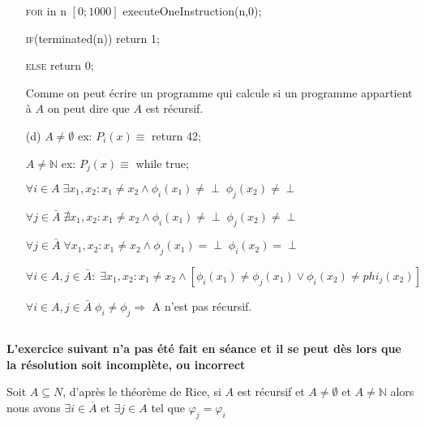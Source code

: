 \begin{itemize}
	\textsc{for} in n $[0;1000]$ executeOneInstruction(n,0);
	 
	\textsc{if}(terminated(n)) return 1;
	 
	\textsc{else} return 0;
	
	Comme on peut écrire un programme qui calcule si un programme appartient à $A$ on peut dire que $A$ est récursif.
	
	\item[(d)] $A \neq \emptyset$ ex: $P_i(x) \equiv$ return 42;
	
	$A \neq \mathbb{N}$ ex: $P_j(x) \equiv$ while true;
	
	$\forall i \in A \; \exists x_1, x_2 : x_1 \neq x_2 \land \phi_i(x_1) \neq \perp \; \phi_j(x_2) \neq \perp$
	
	$\forall j \in \bar{A} \; \nexists x_1, x_2 : x_1 \neq x_2 \land \phi_i(x_1) \neq \perp \; \phi_j(x_2) \neq \perp$
	
	$\forall j \in \bar{A} \; \forall x_1, x_2 : x_1 \neq x_2 \land \phi_j(x_1) = \perp \; \phi_i(x_2) = \perp$
	
	$\forall i \in A, j \in \bar{A}: \; \exists x_1, x_2: x_1 \neq x_2 \land [\phi_i(x_1) \neq \phi_j(x_1) \lor \phi_i(x_2) \neq phi_j(x_2)]$
	
	$\forall i \in A, j \in \bar{A} \; \phi_i \neq \phi_j \Rightarrow$ A n'est pas récursif.
	
\end{itemize}

\subsection{}
\nosolution

\subsection{}
\nosolution

\subsection{}

\textbf{L'exercice suivant n'a pas été fait en séance et il se peut dès lors que la résolution soit incomplète, ou incorrect}

Soit $A \subseteq N$, d'après le théorème de Rice, si $A$ est récursif et $A \neq \emptyset$ et $A\neq \mathbb{N}$ alors nous avons $\exists i \in \overline{A}$ et $\exists j \in A$ tel que $\varphi_j = \varphi_i$

